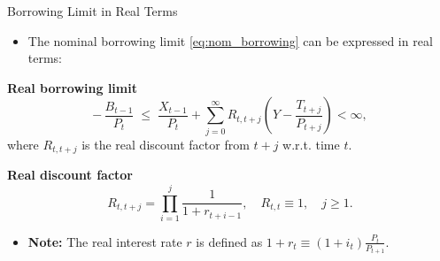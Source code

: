\documentclass[11pt,aspectratio=169]{beamer}
\begin{document}
\begin{frame}{Borrowing Limit in Real Terms}

\begin{itemize}
    \item The nominal borrowing limit \eqref{eq:nom_borrowing} can be expressed in real terms:
\end{itemize}

\vspace{0.25cm}
\noindent\textbf{Real borrowing limit}
\begin{equation}
  -\,\frac{B_{t-1}}{P_t} \;\le\; \frac{X_{t-1}}{P_t} 
  + \sum_{j=0}^{\infty} R_{t,t+j} \left( Y - \frac{T_{t+j}}{P_{t+j}} \right) 
  < \infty,
\label{eq:real_borrowing}
\end{equation}
\hspace{0.65cm} where $R_{t,t+j}$ is the real discount factor from $t+j$ w.r.t. time $t$.

\vspace{0.25cm}
\noindent\textbf{Real discount factor}
\[
R_{t,t+j} = \prod_{i=1}^{j} \frac{1}{1 + r_{t+i-1}}, 
\quad R_{t,t} \equiv 1, 
\quad j \ge 1.
\label{eq:real_discount_fac}
\]

\begin{itemize} \item \textbf{Note:} The real interest rate $r$ is defined as $1+r_t \equiv (1+i_t)\frac{P_t}{P_{t+1}}$. \end{itemize}

\end{frame}
\end{document}
